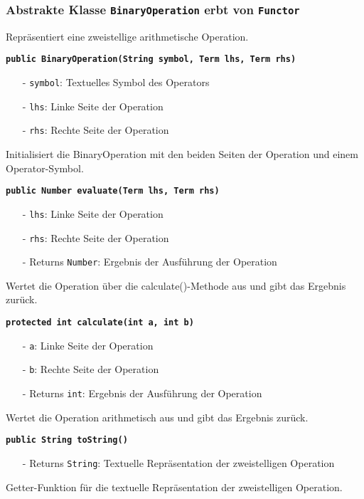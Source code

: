 \documentclass[parskip=full,11pt,twoside]{scrartcl}
\begin{document}
\subsubsection{Abstrakte Klasse \texttt{BinaryOperation} erbt von \texttt{Functor}}
Repräsentiert eine zweistellige arithmetische Operation.

\textbf{\texttt{public BinaryOperation(String symbol, Term lhs, Term rhs)}}
\begin{itemize}[noitemsep]
	\item[-] \texttt{symbol}: Textuelles Symbol des Operators
	\item[-] \texttt{lhs}: Linke Seite der Operation
	\item[-] \texttt{rhs}: Rechte Seite der Operation
\end{itemize}
Initialisiert die BinaryOperation mit den beiden Seiten der Operation und einem Operator-Symbol.

\textbf{\texttt{public Number evaluate(Term lhs, Term rhs)}}
\begin{itemize}[noitemsep]
	\item[-] \texttt{lhs}: Linke Seite der Operation
	\item[-] \texttt{rhs}: Rechte Seite der Operation
	\item[-] Returns \texttt{Number}: Ergebnis der Ausführung der Operation
\end{itemize}
Wertet die Operation über die calculate()-Methode aus und gibt das Ergebnis zurück.

\textbf{\texttt{protected int calculate(int a, int b)}}
\begin{itemize}[noitemsep]
	\item[-] \texttt{a}: Linke Seite der Operation
	\item[-] \texttt{b}: Rechte Seite der Operation
	\item[-] Returns \texttt{int}: Ergebnis der Ausführung der Operation
\end{itemize}
Wertet die Operation arithmetisch aus und gibt das Ergebnis zurück.

\textbf{\texttt{public String toString()}}
\begin{itemize}[noitemsep]
	\item[-] Returns \texttt{String}: Textuelle Repräsentation der zweistelligen Operation
\end{itemize}
Getter-Funktion für die textuelle Repräsentation der zweistelligen Operation.
\end{document}
